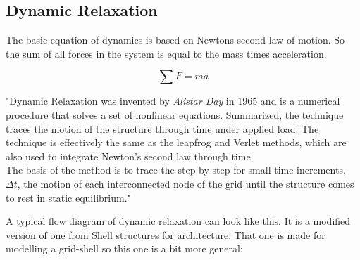 \subsection{Dynamic Relaxation}

The basic equation of dynamics is based on Newtons second law of motion. So the sum of all forces in the system is equal to the mass times acceleration.

\begin{equation}
\sum F = ma
\end{equation}

"Dynamic Relaxation was invented by \textit{ Alistar Day} in 1965 and is a numerical procedure that solves a set of nonlinear equations. Summarized, the technique traces the motion of the structure through time under applied load. The technique is effectively the same as the leapfrog and Verlet methods, which are also used to integrate Newton's second law through time.\\
The basis of the method is to trace the step by step for small time increments, $\Delta t$, the motion of each interconnected node of the grid until the structure comes to rest in static equilibrium."

A typical flow diagram of dynamic relaxation can look like this. It is a modified version of one from Shell structures for architecture. That one is made for modelling a grid-shell so this one is a bit more general:


